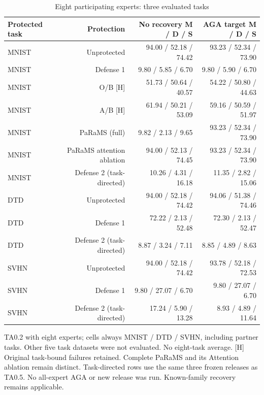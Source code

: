\begin{table}[!htbp]
\centering
\small
\caption{Eight participating experts: three evaluated tasks}
\label{tab:eight}
\begin{tabular}{lrrr}
\toprule
Protected task & Protection & No recovery M / D / S & AGA target M / D / S \\
\midrule
MNIST & Unprotected & 94.00 / 52.18 / 74.42 & 93.23 / 52.34 / 73.90 \\
MNIST & Defense 1 & 9.80 / 5.85 / 6.70 & 9.80 / 5.90 / 6.70 \\
MNIST & O/B [H] & 51.73 / 50.64 / 40.57 & 54.22 / 50.80 / 44.63 \\
MNIST & A/B [H] & 61.94 / 50.21 / 53.09 & 59.16 / 50.59 / 51.97 \\
MNIST & PaRaMS (full) & 9.82 / 2.13 / 9.65 & 93.23 / 52.34 / 73.90 \\
MNIST & PaRaMS attention ablation & 94.00 / 52.13 / 74.45 & 93.23 / 52.34 / 73.90 \\
MNIST & Defense 2 (task-directed) & 10.26 / 4.31 / 16.18 & 11.35 / 2.82 / 15.06 \\
DTD & Unprotected & 94.00 / 52.18 / 74.42 & 94.06 / 51.38 / 74.46 \\
DTD & Defense 1 & 72.22 / 2.13 / 52.48 & 72.30 / 2.13 / 52.47 \\
DTD & Defense 2 (task-directed) & 8.87 / 3.24 / 7.11 & 8.85 / 4.89 / 8.63 \\
SVHN & Unprotected & 94.00 / 52.18 / 74.42 & 93.78 / 52.18 / 72.53 \\
SVHN & Defense 1 & 9.80 / 27.07 / 6.70 & 9.80 / 27.07 / 6.70 \\
SVHN & Defense 2 (task-directed) & 17.24 / 5.90 / 13.28 & 8.93 / 4.89 / 11.64 \\
\bottomrule
\end{tabular}
\par\vspace{3pt}\begin{minipage}{0.98\linewidth}\footnotesize TA0.2 with eight experts; cells always MNIST / DTD / SVHN, including partner tasks. Other five task datasets were not evaluated. No eight-task average. [H] Original task-bound failures retained. Complete PaRaMS and its Attention ablation remain distinct. Task-directed rows use the same three frozen releases as TA0.5. No all-expert AGA or new release was run. Known-family recovery remains applicable.\end{minipage}
\end{table}

